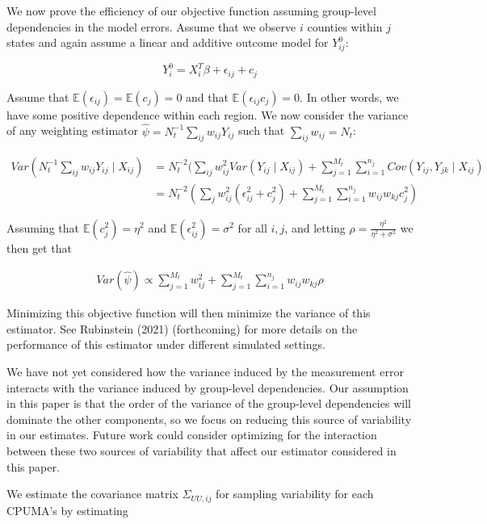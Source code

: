 \documentclass[12pt]{article}
\begin{document}
We now prove the efficiency of our objective function assuming group-level dependencies in the model errors. Assume that we observe $i$ counties within $j$ states and again assume a linear and additive outcome model for $Y_{ij}^0$:

$$
Y_i^0 = X_i^T\beta + \epsilon_{ij} + c_j
$$

Assume that $\mathbb{E}(\epsilon_{ij}) = \mathbb{E}(c_j) = 0$ and that $\mathbb{E}(\epsilon_{ij}c_j) = 0$. In other words, we have some positive dependence within each region. We now consider the variance of any weighting estimator $\hat{\psi} = N_t^{-1}\sum_{ij}w_{ij}Y_{ij}$ such that $\sum_{ij} w_{ij} = N_t$:

\begin{align*}
    Var(N_t^{-1}\sum_{ij}w_{ij}Y_{ij} \mid X_{ij}) &= N_t^{-2}(\sum_{ij}w_{ij}^2Var(Y_{ij} \mid X_{ij}) + \sum_{j=1}^{M_t}\sum_{i=1}^{n_j}Cov(Y_{ij}, Y_{jk} \mid X_{ij}) \\
    &= N_t^{-2} (\sum_j w_{ij}^2(\epsilon_{ij}^2 + c_j^2) + \sum_{j=1}^{M_t}\sum_{i=1}^{n_j}w_{ij}w_{kj}c_j^2)
\end{align*}

Assuming that $\mathbb{E}(c_j^2) = \eta^2$ and $\mathbb{E}(\epsilon_{ij}^2) = \sigma^2$ for all $i, j$, and letting $\rho = \frac{\eta^2}{\eta^2 + \sigma^2}$ we then get that

\begin{align*}
    Var(\hat{\psi}) \propto \sum_{j=1}^{M_t} w_{ij}^2 + \sum_{j=1}^{M_t}\sum_{i=1}^{n_j}w_{ij}w_{kj}\rho
\end{align*}

Minimizing this objective function will then minimize the variance of this estimator. See Rubinstein (2021) (forthcoming) for more details on the performance of this estimator under different simulated settings.

We have not yet considered how the variance induced by the measurement error interacts with the variance induced by group-level dependencies. Our assumption in this paper is that the order of the variance of the group-level dependencies will dominate the other components, so we focus on reducing this source of variability in our estimates. Future work could consider optimizing for the interaction between these two sources of variability that affect our estimator considered in this paper.


We estimate the covariance matrix $\Sigma_{UU, ij}$ for sampling variability for each CPUMA's by estimating
\end{document}
